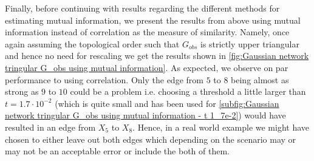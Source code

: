 \documentclass[../Thesis.tex]{subfiles}
\begin{document}
Finally, before continuing with results regarding the different methods for estimating mutual information, we present the results from above using mutual information instead of correlation as the measure of similarity. Namely, once again assuming the topological order such that $G_{obs}$ is strictly upper triangular and hence no need for rescaling we get the results shown in \autoref{fig:Gaussian network tringular G_obs using mutual information}. As expected, we observe on par performance to using correlation. Only the edge from $5$ to $8$ being almost as strong as $9$ to $10$ could be a problem i.e. choosing a threshold a little larger than $t = 1.7 \cdot 10^{-2}$ (which is quite small and has been used for \autoref{subfig:Gaussian network tringular G_obs using mutual information - t 1_7e-2}) would have resulted in an edge from $X_5$ to $X_8$. Hence, in a real world example we might have chosen to either leave out both edges which depending on the scenario may or may not be an acceptable error or include the both of them.
\end{document}
